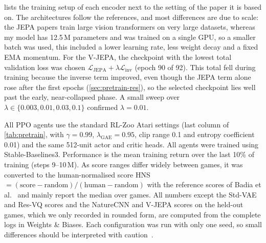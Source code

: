 \documentclass[runningheads]{llncs}
\begin{document}
 lists the training setup of each encoder next to the setting of the paper
it is based on. The architectures follow the references, and most differences are due to scale: the JEPA
papers train large vision transformers on very large datasets, whereas my model has
12.5\,M parameters and was trained on a single GPU, so a smaller batch was used, this included a lower learning
rate, less weight decay and a fixed EMA momentum. For the V-JEPA, the checkpoint with
the lowest total validation loss was chosen $\mathcal{L}_{\text{JEPA}}+\lambda\mathcal{L}_{\text{inv}}$
(epoch 90 of 92). This total fell during training because the inverse term improved, even though
the JEPA term alone rose after the first epochs (\cref{sec:pretrain-res}), so the selected
checkpoint lies well past the early, near-collapsed phase. A small sweep over
$\lambda\in\{0.003,0.01,0.03,0.1\}$ confirmed $\lambda=0.01$.

All PPO agents use the standard RL-Zoo Atari settings (last column of \cref{tab:pretrain},
with $\gamma=0.99$, $\lambda_{\text{GAE}}=0.95$, clip range 0.1 and entropy coefficient 0.01)
and the same 512-unit actor and critic heads. All agents were trained using
Stable-Baselines3. Performance is the mean training return over the last 10\% of training (steps 9--10\,M). As
score ranges differ widely between games, it was converted to the human-normalised score
HNS$=(\text{score}-\text{random})/(\text{human}-\text{random})$ with the reference scores of
Badia et al.~\cite{badia2020agent57} and mainly report the median over games. All numbers
except the Std-VAE and Res-VQ scores and the NatureCNN and V-JEPA scores on the held-out games,
which we only recorded in rounded form, are computed from the complete logs in Weights \& Biases. Each configuration was run with only one
seed, so small differences should be interpreted with caution~\cite{agarwal2021precipice}.
\end{document}
